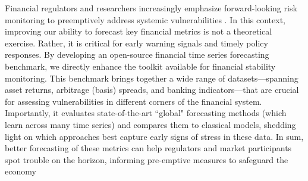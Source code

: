 \documentclass{article}
\begin{document}
Financial regulators and researchers increasingly emphasize forward-looking risk monitoring to preemptively address systemic vulnerabilities \cite{Adrian2015}. 
In this context, improving our ability to forecast key financial metrics is not a theoretical exercise. Rather,
it is critical for early warning signals and timely policy responses. 
By developing an open-source financial time series forecasting benchmark, we directly enhance the toolkit available for financial stability monitoring. This benchmark brings together a wide range of datasets---spanning asset returns, arbitrage (basis) spreads, and banking indicators---that are crucial for assessing vulnerabilities in different corners of the financial system. Importantly, it evaluates state-of-the-art ``global" forecasting methods (which learn across many time series) and compares them to classical models, shedding light on which approaches best capture early signs of stress in these data. In sum, better forecasting of these metrics can help regulators and market participants spot trouble on the horizon, informing pre-emptive measures to safeguard the economy
\end{document}

